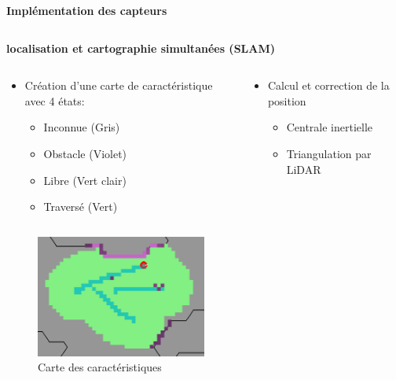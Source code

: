 \documentclass[aspectratio=169,10pt]{beamer}
\begin{document}
\begin{frame}{\textbf{Implémentation des capteurs}}
\begin{columns}
\begin{column}{0.5\textwidth}
		\end{column}
	\end{columns}
\end{frame}


\begin{frame}{\textbf{localisation et cartographie simultanées (SLAM)}}
	\begin{columns}[t]
		\begin{column}{0.5\textwidth}
			\begin{itemize}
				\item Création d'une carte de caractéristique avec 4 états:
				\begin{itemize}
					\item Inconnue (Gris)
					\item Obstacle (Violet)
					\item Libre (Vert clair)
					\item Traversé (Vert)
				\end{itemize}				
			\end{itemize}
		\end{column}
		\begin{column}{0.5\textwidth}
			\begin{itemize}
			\item Calcul et correction de la position
				\begin{itemize}
					\item Centrale inertielle
					\item Triangulation par LiDAR
				\end{itemize}
			\end{itemize}
		\end{column}
	\end{columns}
	\begin{columns}[t]
		\begin{column}{0.5\textwidth}
			\begin{figure}
				\centering
				\includegraphics[width=0.5\textwidth]{IMAGES/lgm_t3_c.png}
				\caption{Carte des caractéristiques}
			\end{figure}

\end{column}
\end{columns}
\end{frame}
\end{document}
